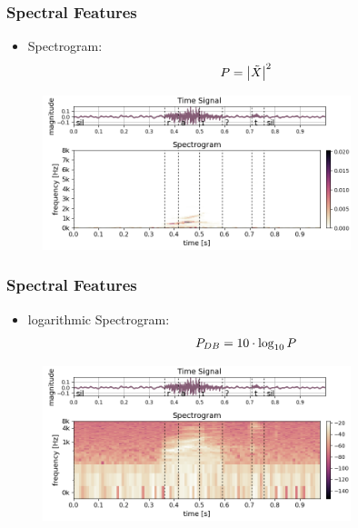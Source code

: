 \begin{frame}
  \frametitle{Spectral Features}
  \vspace{-0.5cm}
  \begin{itemize}
    \item Spectrogram:
    \begin{equation*}
      \footnotesize
      P = \abs{\tilde{X}}^2
    \end{equation*}
  \end{itemize}
  \begin{figure} \includegraphics[width=0.8\textwidth]{../3_signal/figs/signal_spec-lin_showcase_right0.png} \end{figure}
\end{frame}

\begin{frame}
  \frametitle{Spectral Features}
  \vspace{-0.5cm}
  \begin{itemize}
    \item logarithmic Spectrogram:
    \begin{equation*}
      \footnotesize
      P_{DB} = 10 \cdot \log_{10}{P}
    \end{equation*}
  \end{itemize}
  \begin{figure} \includegraphics[width=0.8\textwidth]{../3_signal/figs/signal_spec-log_showcase_right0.png} \end{figure}
\end{frame}

